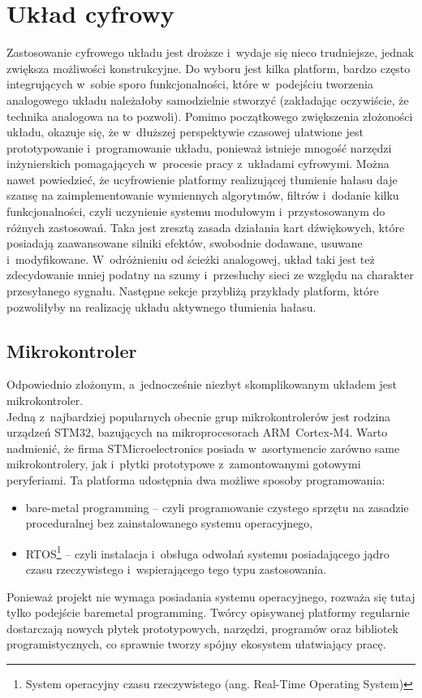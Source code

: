 \section{Układ cyfrowy}
\label{sec:digital}
Zastosowanie cyfrowego układu jest droższe i~wydaje się nieco trudniejsze, jednak zwiększa możliwości konstrukcyjne. Do wyboru jest kilka platform, bardzo często integrujących w~sobie sporo funkcjonalności, które w~podejściu tworzenia analogowego układu należałoby samodzielnie stworzyć (zakładając oczywiście, że technika analogowa na to pozwoli).  Pomimo początkowego zwiększenia złożoności układu, okazuje się, że w~dłuższej perspektywie czasowej ułatwione jest prototypowanie i~programowanie układu, ponieważ istnieje mnogość narzędzi inżynierskich pomagających w~procesie pracy z~układami cyfrowymi. Można nawet powiedzieć, że ucyfrowienie platformy realizującej tłumienie hałasu daje szansę na zaimplementowanie wymiennych algorytmów, filtrów i~dodanie kilku funkcjonalności, czyli uczynienie systemu modułowym i~przystosowanym do różnych zastosowań. Taka jest zresztą zasada działania kart dźwiękowych, które posiadają zaawansowane silniki efektów, swobodnie dodawane, usuwane i~modyfikowane. W~odróżnieniu od ścieżki analogowej, układ taki jest też zdecydowanie mniej podatny na szumy i~przesłuchy sieci ze względu na charakter przesyłanego sygnału. Następne sekcje przybliżą przykłady platform, które pozwoliłyby na realizację układu aktywnego tłumienia hałasu.
\subsection{Mikrokontroler}
\label{uC}
Odpowiednio złożonym, a~jednocześnie niezbyt skomplikowanym układem jest mikrokontroler.\\
Jedną z~najbardziej popularnych obecnie grup mikrokontrolerów jest rodzina urządzeń STM32, bazujących na mikroprocesorach ARM~Cortex-M4. Warto nadmienić, że firma STMicroelectronics posiada w~asortymencie zarówno same mikrokontrolery, jak i~płytki prototypowe z~zamontowanymi gotowymi peryferiami. Ta platforma udostępnia dwa możliwe sposoby programowania:
\begin{itemize}
	\item bare-metal programming -- czyli programowanie czystego sprzętu na zasadzie proceduralnej bez zainstalowanego systemu operacyjnego,
	\item RTOS\footnote{System operacyjny czasu rzeczywistego (ang. Real-Time Operating System)} -- czyli instalacja i~obsługa odwołań systemu posiadającego jądro czasu rzeczywistego i~wspierającego tego typu zastosowania.
\end{itemize}
Ponieważ projekt nie wymaga posiadania systemu operacyjnego, rozważa się tutaj tylko podejście baremetal programming. Twórcy opisywanej platformy regularnie dostarczają nowych płytek prototypowych, narzędzi, programów oraz bibliotek programistycznych, co sprawnie tworzy spójny ekosystem ułatwiający pracę.
